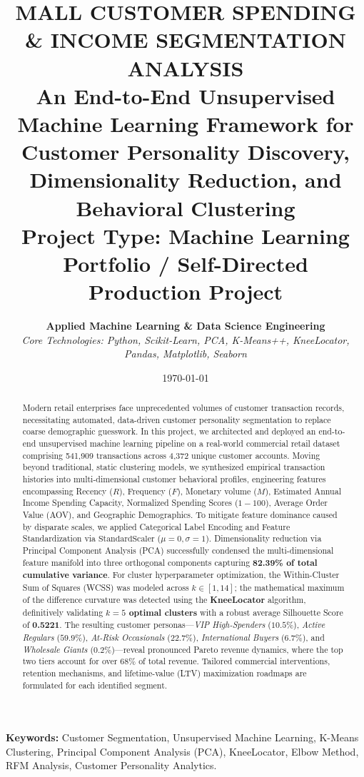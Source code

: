\documentclass[11pt,a4paper]{article}
\title{
    \vspace{-1.5cm}
    \textbf{\Large MALL CUSTOMER SPENDING \& INCOME SEGMENTATION ANALYSIS} \\
    \vspace{0.3cm}
    \large An End-to-End Unsupervised Machine Learning Framework for Customer Personality Discovery, Dimensionality Reduction, and Behavioral Clustering \\
    \vspace{0.2cm}
    \small \textbf{Project Type: Machine Learning Portfolio / Self-Directed Production Project}
}
\author{
    \textbf{Applied Machine Learning \& Data Science Engineering} \\
    \textit{Core Technologies: Python, Scikit-Learn, PCA, K-Means++, KneeLocator, Pandas, Matplotlib, Seaborn}
}
\date{\today}
\begin{document}
\maketitle

\begin{abstract}
Modern retail enterprises face unprecedented volumes of customer transaction records, necessitating automated, data-driven customer personality segmentation to replace coarse demographic guesswork. In this project, we architected and deployed an end-to-end unsupervised machine learning pipeline on a real-world commercial retail dataset comprising 541,909 transactions across 4,372 unique customer accounts. Moving beyond traditional, static clustering models, we synthesized empirical transaction histories into multi-dimensional customer behavioral profiles, engineering features encompassing Recency ($R$), Frequency ($F$), Monetary volume ($M$), Estimated Annual Income Spending Capacity, Normalized Spending Scores ($1-100$), Average Order Value (AOV), and Geographic Demographics. To mitigate feature dominance caused by disparate scales, we applied Categorical Label Encoding and Feature Standardization via $\text{StandardScaler}$ ($\mu=0, \sigma=1$). Dimensionality reduction via Principal Component Analysis (PCA) successfully condensed the multi-dimensional feature manifold into three orthogonal components capturing \textbf{82.39\% of total cumulative variance}. For cluster hyperparameter optimization, the Within-Cluster Sum of Squares (WCSS) was modeled across $k \in [1, 14]$; the mathematical maximum of the difference curvature was detected using the \textbf{KneeLocator} algorithm, definitively validating \textbf{$k = 5$ optimal clusters} with a robust average Silhouette Score of \textbf{0.5221}. The resulting customer personas---\textit{VIP High-Spenders} ($10.5\%$), \textit{Active Regulars} ($59.9\%$), \textit{At-Risk Occasionals} ($22.7\%$), \textit{International Buyers} ($6.7\%$), and \textit{Wholesale Giants} ($0.2\%$)---reveal pronounced Pareto revenue dynamics, where the top two tiers account for over $68\%$ of total revenue. Tailored commercial interventions, retention mechanisms, and lifetime-value (LTV) maximization roadmaps are formulated for each identified segment.
\end{abstract}

\vspace{0.3cm}
\noindent\textbf{Keywords:} Customer Segmentation, Unsupervised Machine Learning, K-Means Clustering, Principal Component Analysis (PCA), KneeLocator, Elbow Method, RFM Analysis, Customer Personality Analytics.
\end{document}
